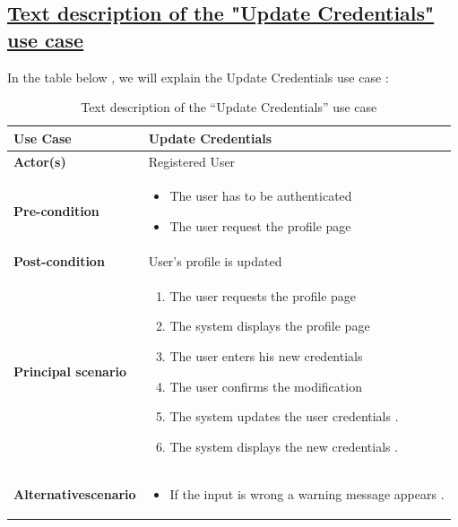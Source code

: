 \subsection*{\textbf{\underline{Text description of the "Update Credentials" use case}}}

\vspace{0.25cm}
In the table below , we will explain the Update Credentials use case : 

\begin{table}[H]
    \renewcommand{\arraystretch}{1.5}
    
   \begin{tabular}{|p{}|p{}|}
   \hline
     
        \textbf{Use Case} &Update Credentials  \\   \hline
        
        \textbf{Actor(s) } & Registered User  \\   \hline
        \textbf{Pre-condition} &  
        \begin{itemize}[left=0pt]
             \renewcommand\labelitemi{\textbf{\Huge .}}
            \item The user has to be authenticated 
            \item The user request the profile page 
        \end{itemize} \\   \hline


        \textbf{Post-condition} & User's profile is updated \\  \hline

                \textbf{Principal scenario} & 
                \begin{enumerate}[left=0pt]
                \item The user requests the profile page
                \item The system displays the profile page
                \item The user enters his new credentials
                \item The user confirms the modification
                \item The system updates the user credentials .
                \item The system displays the new credentials .
                \end{enumerate}  \\   \hline
                 
          \textbf{Alternative\newline scenario} & 
        \begin{itemize}[left=0pt]
             \renewcommand\labelitemi{\textbf{\Huge .}}
            \item If the input is wrong a warning message appears .

        \end{itemize} \\   \hline
\end{tabular}
         \caption{Text description of the “Update Credentials” use case}
    \label{tab:my_label}
\end{table}

